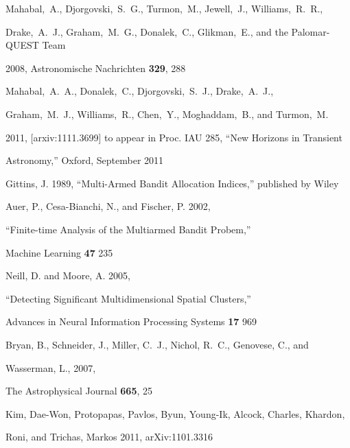 \documentclass[prd,nofootbib,floatfix,11pt,tightenlines,nofootinbib]{revtex4}
\begin{document}
\begin{thebibliography}{99}

Mahabal,~A., Djorgovski,~S.~G., Turmon,~M., Jewell,~J., Williams,~R.~R.,

Drake,~A.~J., Graham,~M.~G., Donalek,~C., Glikman,~E., and the Palomar-QUEST Team

2008, Astronomische Nachrichten {\bf 329}, 288






Mahabal,~A.~A., Donalek,~C., Djorgovski,~S.~J., Drake,~A.~J.,

Graham,~M.~J., Williams,~R., Chen,~Y., Moghaddam,~B., and Turmon,~M.

2011, [arxiv:1111.3699] to appear in Proc. IAU 285, ``New Horizons in Transient

Astronomy,'' Oxford, September 2011




Gittins, J. 1989, ``Multi-Armed Bandit Allocation Indices,'' published by Wiley




Auer, P., Cesa-Bianchi, N., and Fischer, P. 2002,

``Finite-time Analysis of the Multiarmed Bandit Probem,''

Machine Learning {\bf 47} 235




Neill, D. and Moore, A. 2005,

``Detecting Significant Multidimensional Spatial Clusters,''

Advances in Neural Information Processing Systems {\bf 17} 969




Bryan, B., Schneider, J., Miller, C.~J., Nichol, R.~C., Genovese, C., and

Wasserman, L., 2007,

The Astrophysical Journal {\bf 665}, 25




Kim, Dae-Won, Protopapas, Pavlos, Byun, Young-Ik, Alcock, Charles, Khardon,

Roni, and Trichas, Markos 2011, arXiv:1101.3316




\end{thebibliography}
\end{document}
